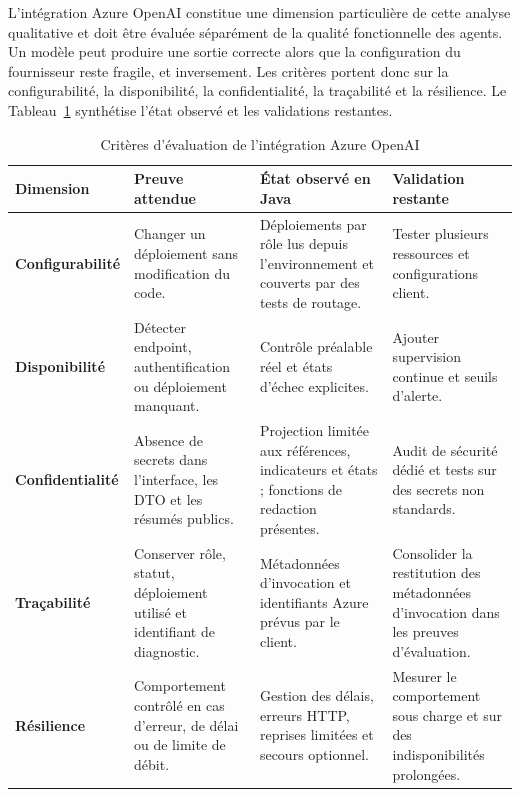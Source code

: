 L'intégration Azure OpenAI constitue une dimension particulière de cette analyse qualitative et doit être évaluée séparément de la qualité fonctionnelle des agents. Un modèle peut produire une sortie correcte alors que la configuration du fournisseur reste fragile, et inversement. Les critères portent donc sur la configurabilité, la disponibilité, la confidentialité, la traçabilité et la résilience. Le Tableau~\ref{tab:evaluation-azure-ch5} synthétise l'état observé et les validations restantes.

\begin{table}[H]
    \centering
    \caption{Critères d'évaluation de l'intégration Azure OpenAI}
    \label{tab:evaluation-azure-ch5}
    \scriptsize
    \begin{tabularx}{\textwidth}{|>{\bfseries\RaggedRight\arraybackslash}p{3cm}|>{\RaggedRight\arraybackslash}p{4.5cm}|>{\RaggedRight\arraybackslash}p{4.5cm}|>{\RaggedRight\arraybackslash}X|}
        \hline
        \rowcolor{cgilight!95}
        \textbf{Dimension} & \textbf{Preuve attendue} & \textbf{État observé en Java} & \textbf{Validation restante} \\
        \hline
        Configurabilité & Changer un déploiement sans modification du code. & Déploiements par rôle lus depuis l'environnement et couverts par des tests de routage. & Tester plusieurs ressources et configurations client. \\
        \hline
        Disponibilité & Détecter endpoint, authentification ou déploiement manquant. & Contrôle préalable réel et états d'échec explicites. & Ajouter supervision continue et seuils d'alerte. \\
        \hline
        Confidentialité & Absence de secrets dans l'interface, les DTO et les résumés publics. & Projection limitée aux références, indicateurs et états ; fonctions de redaction présentes. & Audit de sécurité dédié et tests sur des secrets non standards. \\
        \hline
        Traçabilité & Conserver rôle, statut, déploiement utilisé et identifiant de diagnostic. & Métadonnées d'invocation et identifiants Azure prévus par le client. & Consolider la restitution des métadonnées d'invocation dans les preuves d'évaluation. \\
        \hline
        Résilience & Comportement contrôlé en cas d'erreur, de délai ou de limite de débit. & Gestion des délais, erreurs HTTP, reprises limitées et secours optionnel. & Mesurer le comportement sous charge et sur des indisponibilités prolongées. \\

\end{tabularx}
\end{table}
